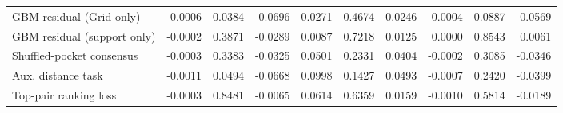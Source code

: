 \begin{table}[t]
\begin{tabular}{lrrrrrrrrr}
GBM residual (Grid only) & 0.0006 & 0.0384 & 0.0696 & 0.0271 & 0.4674 & 0.0246 & 0.0004 & 0.0887 & 0.0569 \\
GBM residual (support only) & -0.0002 & 0.3871 & -0.0289 & 0.0087 & 0.7218 & 0.0125 & 0.0000 & 0.8543 & 0.0061 \\
Shuffled-pocket consensus & -0.0003 & 0.3383 & -0.0325 & 0.0501 & 0.2331 & 0.0404 & -0.0002 & 0.3085 & -0.0346 \\
Aux. distance task & -0.0011 & 0.0494 & -0.0668 & 0.0998 & 0.1427 & 0.0493 & -0.0007 & 0.2420 & -0.0399 \\
Top-pair ranking loss & -0.0003 & 0.8481 & -0.0065 & 0.0614 & 0.6359 & 0.0159 & -0.0010 & 0.5814 & -0.0189 \\
\bottomrule
\end{tabular}
\end{table}
